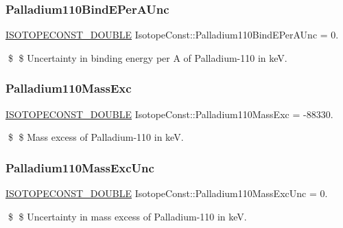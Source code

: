 \subsubsection{\texorpdfstring{Palladium110\+Bind\+E\+Per\+A\+Unc}{Palladium110BindEPerAUnc}}
{\footnotesize\ttfamily \mbox{\hyperlink{group___isotope_const-_macros_ga8f45a7272ce02c0b4c65c44636ed719a}{I\+S\+O\+T\+O\+P\+E\+C\+O\+N\+S\+T\+\_\+\+D\+O\+U\+B\+LE}} Isotope\+Const\+::\+Palladium110\+Bind\+E\+Per\+A\+Unc = 0.}

\$ \$ Uncertainty in binding energy per A of Palladium-\/110 in keV. \mbox{\label{group___isotope_const-_palladium-_pd110_ga96e15e057beca7fc81e819084664927a}} 
\subsubsection{\texorpdfstring{Palladium110\+Mass\+Exc}{Palladium110MassExc}}
{\footnotesize\ttfamily \mbox{\hyperlink{group___isotope_const-_macros_ga8f45a7272ce02c0b4c65c44636ed719a}{I\+S\+O\+T\+O\+P\+E\+C\+O\+N\+S\+T\+\_\+\+D\+O\+U\+B\+LE}} Isotope\+Const\+::\+Palladium110\+Mass\+Exc = -\/88330.}

\$ \$ Mass excess of Palladium-\/110 in keV. \mbox{\label{group___isotope_const-_palladium-_pd110_ga87b1ba6a69658bc25d645758e99b082e}} 
\subsubsection{\texorpdfstring{Palladium110\+Mass\+Exc\+Unc}{Palladium110MassExcUnc}}
{\footnotesize\ttfamily \mbox{\hyperlink{group___isotope_const-_macros_ga8f45a7272ce02c0b4c65c44636ed719a}{I\+S\+O\+T\+O\+P\+E\+C\+O\+N\+S\+T\+\_\+\+D\+O\+U\+B\+LE}} Isotope\+Const\+::\+Palladium110\+Mass\+Exc\+Unc = 0.}

\$ \$ Uncertainty in mass excess of Palladium-\/110 in keV. \mbox{\label{group___isotope_const-_palladium-_pd110_ga38da6159db7b3beca1e467775d2d7b1e}} 
